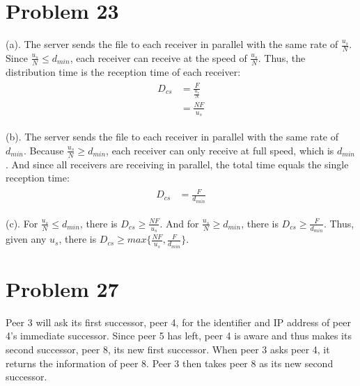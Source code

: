 \documentclass[titlepage, paper=a4, fontsize=11pt]{scrartcl} %
\numberwithin{equation}{section} %
\numberwithin{figure}{section} %
\numberwithin{table}{section} %
\begin{document}

\section*{Problem 23}
(a). The server sends the file to each receiver in parallel with the same rate of $\frac{u_s}{N}$.
Since $\frac{u_s}{N} \leqslant d_{min}$, each receiver can receive at the speed of $\frac{u_s}{N}$.
Thus, the distribution time is the reception time of each receiver:
\begin{align*} 
\begin{split}
D_{cs} &= \frac{F}{\frac{u_s}{N}} \\
&= \frac{NF}{u_s}
\end{split}					
\end{align*}

(b). The server sends the file to each receiver in parallel with the same rate of $d_{min}$.
Because $\frac{u_s}{N} \geqslant d_{min}$, each receiver can only receive at full speed, which is $d_{min}$.
And since all receivers are receiving in parallel, the total time equals the single reception time:
\begin{align*} 
\begin{split}
D_{cs} &= \frac{F}{d_{min}}
\end{split}					
\end{align*}

(c). For $\frac{u_s}{N} \leqslant d_{min}$, there is $D_{cs} \geqslant \frac{NF}{u_s}$.
And for $\frac{u_s}{N} \geqslant d_{min}$, there is $D_{cs} \geqslant \frac{F}{d_{min}}$.
Thus, given any $u_s$, there is $D_{cs} \geqslant max\{ \frac{NF}{u_s}, \frac{F}{d_{min}} \}$.
\\



\section*{Problem 27}
Peer 3 will ask its first successor, peer 4, for the identifier and IP address of peer 4's immediate successor.
Since peer 5 has left, peer 4 is aware and thus makes its second successor, peer 8, its new first successor.
When peer 3 asks peer 4, it returns the information of peer 8. Peer 3 then takes peer 8 as its new second successor.
\\
\end{document}
